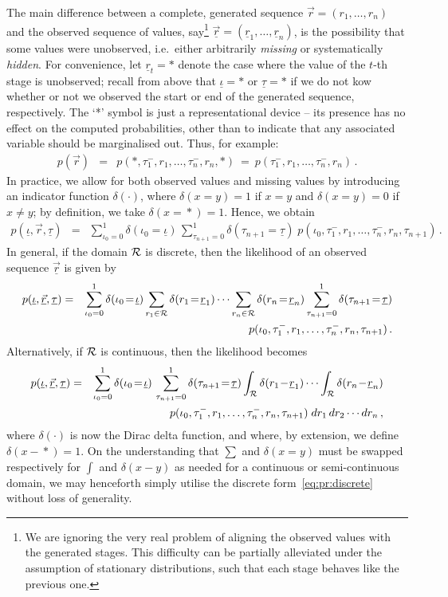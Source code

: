 \documentclass[a4paper]{article}
\newcommand{\ui}{\underline{\iota}}
\newcommand{\ut}{\underline{\tau}}
\newcommand{\ur}{\underline{r}}
\newcommand{\vr}{\vec{r}}
\newcommand{\uvr}{\underline{\vr}}
\newcommand{\tm}{\tau^{-}}
\begin{document}
The main difference between a complete, generated sequence $\vr=(r_1,\ldots,r_n)$
and the observed sequence of values, say\footnote{We are ignoring the very real problem
of aligning the observed values with the generated stages. This difficulty can be partially alleviated under the assumption of stationary distributions, such that each stage behaves
like the previous one.} 
$\uvr=(\ur_1,\ldots,\ur_n)$, 
is the possibility that some values were unobserved, i.e.\ either arbitrarily {\em missing} or systematically {\em hidden}.
For convenience, let $\ur_t=*$ denote the case where the value of the $t$-th stage is unobserved; recall from above that
 $\ui=*$ or $\ut=*$ if we do not kow whether or not we observed the start or end of the generated sequence,
respectively.
The `*' symbol is just a representational device -- its presence has no effect on the computed probabilities, other than to indicate that any associated variable should be marginalised out. Thus, for example:
\begin{eqnarray}
p(\vr) 
& = & p(*,\tm_1,r_1,\ldots,\tm_n,r_n,*)~=~p(\tm_1,r_1,\ldots,\tm_n,r_n)\,.
\end{eqnarray}
In practice, we allow for both observed values and missing values by introducing an indicator function $\delta(\cdot)$,
where $\delta(x\!=\!y)=1$ if $x=y$ and $\delta(x\!=\!y)=0$ if $x\ne y$;  by definition, we take $\delta(x\!=\!*)=1$.
Hence, we obtain
\begin{eqnarray}
p(\ui,\vr,\ut) 
& = & 
\sum_{\iota_0=0}^{1}\delta(\iota_0\!=\!\ui)
\,\sum_{\tau_{n+1}=0}^{1}\delta(\tau_{n+1}\!=\!\ut)\;
p(\iota_0,\tm_1,r_1,\ldots,\tm_n,r_n,\tau_{n+1})\,.
\end{eqnarray}
In general, if the domain ${\cal R}$  is discrete, then the likelihood of an observed sequence $\uvr$  is given by
\begin{eqnarray}
p(\ui,\uvr,\ut) 
& = & 
\sum_{\iota_0=0}^{1}\delta(\iota_0\!=\!\ui)
\sum_{r_1\in{\cal R}} \delta(r_1\!=\!\ur_1)
\cdots\sum_{r_n\in{\cal R}} \delta(r_n\!=\!\ur_n)
\sum_{\tau_{n+1}=0}^{1}\delta(\tau_{n+1}\!=\!\ut)
\nonumber\\
&& \hspace*{5mm}
p(\iota_0,\tm_1,r_1,\ldots,\tm_n,r_n,\tau_{n+1})\,.
\label{eq:pr:discrete}
\end{eqnarray}
Alternatively, if ${\cal R}$ is continuous, then the likelihood becomes
\begin{eqnarray}
p(\ui,\uvr,\ut) 
& = & 
\sum_{\iota_0=0}^{1}\delta(\iota_0\!=\!\ui)
\,\sum_{\tau_{n+1}=0}^{1}\delta(\tau_{n+1}\!=\!\ut)
\int_{{\cal R}} \delta(r_1\!-\!\ur_1)
\cdots\int_{{\cal R}} \delta(r_n\!-\!\ur_n)
\nonumber\\
&& \hspace*{5mm}
p(\iota_0,\tm_1,r_1,\ldots,\tm_n,r_n,\tau_{n+1})
\;dr_1\,dr_2\cdots dr_n
\,,
\end{eqnarray}
where $\delta(\cdot)$ is now the Dirac delta function, and where, by extension, we define $\delta(x\!-\!*)=1$.
On the understanding that $\sum$ and $\delta(x\!=\!y)$ must be swapped respectively for $\int$ and $\delta(x\!-\!y)$ as needed for a continuous 
or semi-continuous domain, we may henceforth simply utilise the discrete form~\eqref{eq:pr:discrete} without loss of generality.
\end{document}
